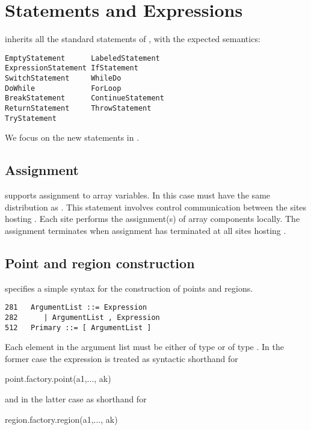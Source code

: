 \chapter{Statements and Expressions}\label{XtenStatements}

\Xten{} inherits all the standard statements of \Java{}, with the expected semantics:

\begin{verbatim}
EmptyStatement      LabeledStatement  
ExpressionStatement IfStatement
SwitchStatement     WhileDo
DoWhile             ForLoop           
BreakStatement      ContinueStatement  
ReturnStatement     ThrowStatement
TryStatement
\end{verbatim}

We focus on the new statements in \Xten. 

\section{Assignment}\label{AssignmentStatement}

%

{}\Xten{} supports assignment  to array variables. In this
case  must have the same distribution  as . This
statement involves control communication between the sites hosting
. Each site performs the assignment(s) of array components
locally. The assignment terminates when assignment has terminated at
all sites hosting .


\section{Point and region construction}\label{point-syntax}
\Xten{} specifies a simple syntax for the construction of points and regions.
\begin{verbatim}
281   ArgumentList ::= Expression
282      | ArgumentList , Expression
512   Primary ::= [ ArgumentList ]
\end{verbatim}
Each element in the argument list must be either of type  or 
of type . In the former case the expression 
 is treated as syntactic shorthand for
\begin{xten}
point.factory.point(a1,..., ak)
\end{xten}
\noindent and in the latter case as shorthand for
\begin{xten}
region.factory.region(a1,..., ak)
\end{xten}

